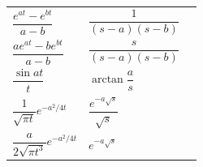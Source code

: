 \documentclass[a4paper, 10pt, ]{article}
\begin{document}
\begin{longtable}[l]{p{3.7cm} @{} p{5.9cm} p{2.8cm}}
    $\dfrac{e^{at}-e^{bt}}{a-b}$            & $\dfrac{1}{(s-a)(s-b)}$               \\[4mm]
    $\dfrac{ae^{at}-be^{bt}}{a-b}$          & $\dfrac{s}{(s-a)(s-b)}$               \\[4mm]
    $\dfrac{\sin at}{t}$                    & $\arctan \dfrac{a}{s}$                \\[4mm]
    $\dfrac{1}{\sqrt{\pi t}}e^{-a^2/4t}$    & $\dfrac{e^{-a\sqrt{s}}}{\sqrt{s}}$    \\[4mm]
    $\dfrac{a}{2\sqrt{\pi t^3}}e^{-a^2/4t}$ & $e^{-a\sqrt{s}}$                      \\[4mm]

    \bottomrule

\end{longtable}





\end{document}
